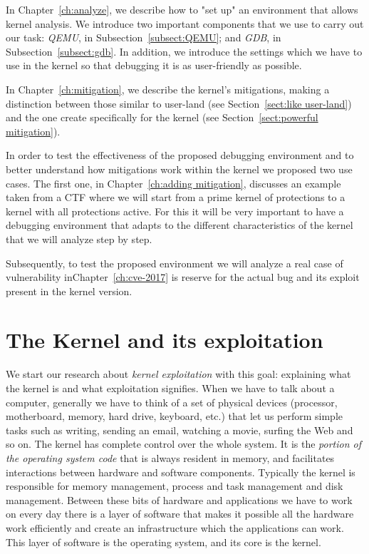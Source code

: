 \documentclass{masterthesis}
\newcommand{\vtnote}[1]{\todo[color=green!20]{#1}}
\newcommand{\refToChapter}[1]{Chapter~\ref{ch:#1}\xspace}
\newcommand{\refToSection}[1]{Section~\ref{sect:#1}\xspace}
\newcommand{\refToSubSection}[1]{Subsection~\ref{subsect:#1}\xspace}
\begin{document}
In \refToChapter{analyze}, we describe how to "set up" an environment that allows kernel analysis.
We introduce two important components that we use to carry out our task: \emph{QEMU}, in \refToSubSection{QEMU}; and \emph{GDB}, in \refToSubSection{gdb}.
In addition, we introduce the settings which we have to use in the kernel so that debugging it is as user-friendly as possible.

In \refToChapter{mitigation}, we describe the kernel’s mitigations, making a distinction between those similar to user-land (see \refToSection{like user-land}) and the one create specifically for the kernel (see \refToSection{powerful mitigation}).

\vtnote{aggiunto} 
In order to test the effectiveness of the proposed debugging environment and to better understand how mitigations work within the kernel we proposed two use cases.
The first one, in \refToChapter{adding mitigation}, discusses an example taken from a CTF where we will start from a prime kernel of protections to a kernel with all protections active. For this it will be very important to have a debugging environment that adapts to the different characteristics of the kernel that we will analyze step by step.

Subsequently, to test the proposed environment we will analyze a real case of vulnerability in\refToChapter{cve-2017} is reserve for the actual bug and its exploit present in the kernel version.


\chapter{The Kernel and its exploitation}
\label{ch:kernel}

We start our research about \emph{kernel exploitation} with this goal: explaining what the kernel is and what exploitation signifies.
When we have to talk about a computer, generally we have to think of a set of physical devices (processor, motherboard, memory, hard drive, keyboard, etc.) that let us perform simple tasks such as writing, sending an email, watching a movie, surfing the Web and so on.
The kernel has complete control over the whole system. It is the \emph{portion of the operating system code} that is always resident in memory, and facilitates interactions between hardware and software components.
Typically the kernel is responsible for memory management, process and task management and disk management.
Between these bits of hardware and applications we have to work on every day there is a layer of software that makes it possible all the hardware work efficiently and create an infrastructure which the applications can work.
This layer of software is the operating system, and its core is the kernel.
\end{document}
